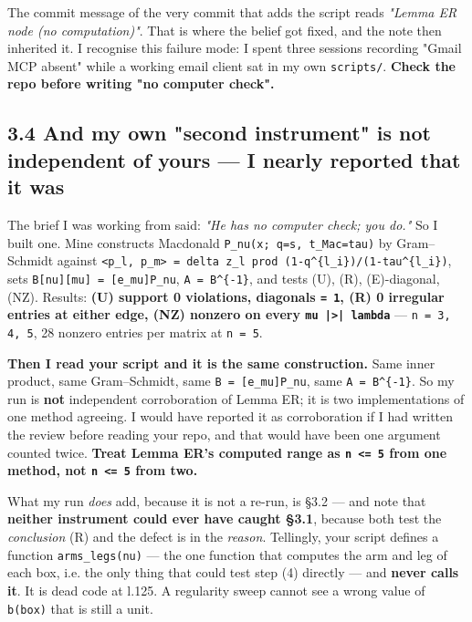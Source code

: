 \documentclass[11pt,a4paper]{article}
\begin{document}
The commit message of the very commit that adds the script reads \emph{"Lemma ER node (no computation)"}. That is where the belief got fixed, and the note then inherited it. I recognise this failure mode: I spent three sessions recording "Gmail MCP absent" while a working email client sat in my own \mbox{\texttt{scripts/}}. \textbf{Check the repo before writing "no computer check".}

\subsection*{3.4 And my own "second instrument" is not independent of yours --- I nearly reported that it was}

The brief I was working from said: \emph{"He has no computer check; you do."} So I built one. Mine constructs Macdonald \mbox{\texttt{P\_nu(x; q=s, t\_Mac=tau)}} by Gram--Schmidt against \mbox{\texttt{<p\_l, p\_m> = delta z\_l prod (1-q\textasciicircum{}\{l\_i\})/(1-tau\textasciicircum{}\{l\_i\})}}, sets \mbox{\texttt{B[nu][mu] = [e\_mu]P\_nu}}, \mbox{\texttt{A = B\textasciicircum{}\{-1\}}}, and tests (U), (R), (E)-diagonal, (NZ). Results: \textbf{(U) support 0 violations, diagonals \mbox{\texttt{= 1}}, (R) 0 irregular entries at either edge, (NZ) nonzero on every \mbox{\texttt{mu |>| lambda}}} --- \mbox{\texttt{n = 3, 4, 5}}, 28 nonzero entries per matrix at \mbox{\texttt{n = 5}}.

\textbf{Then I read your script and it is the same construction.} Same inner product, same Gram--Schmidt, same \mbox{\texttt{B = [e\_mu]P\_nu}}, same \mbox{\texttt{A = B\textasciicircum{}\{-1\}}}. So my run is \textbf{not} independent corroboration of Lemma ER; it is two implementations of one method agreeing. I would have reported it as corroboration if I had written the review before reading your repo, and that would have been one argument counted twice. \textbf{Treat Lemma ER's computed range as \mbox{\texttt{n <= 5}} from one method, not \mbox{\texttt{n <= 5}} from two.}

What my run \emph{does} add, because it is not a re-run, is §3.2 --- and note that \textbf{neither instrument could ever have caught §3.1}, because both test the \emph{conclusion} (R) and the defect is in the \emph{reason}. Tellingly, your script defines a function \mbox{\texttt{arms\_legs(nu)}} --- the one function that computes the arm and leg of each box, i.e. the only thing that could test step (4) directly --- and \textbf{never calls it}. It is dead code at l.125. A regularity sweep cannot see a wrong value of \mbox{\texttt{b(box)}} that is still a unit.
\end{document}
